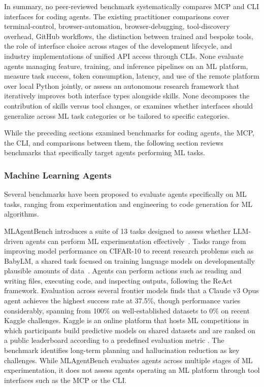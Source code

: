 \documentclass[
english,                 %
bibtex,                  %
includeExtraAbstracts, %
]{kththesis}
\numberwithin{listing}{chapter}
\begin{document}
In summary, no peer-reviewed benchmark systematically compares \gls{MCP} and \gls{CLI} interfaces for coding agents. The existing practitioner comparisons cover terminal-control, browser-automation, browser-debugging, tool-discovery overhead, GitHub workflows, the distinction between trained and bespoke tools, the role of interface choice across stages of the development lifecycle, and industry implementations of unified \gls{API} access through \glspl{CLI}. None evaluate agents managing feature, training, and inference pipelines on an \gls{ML} platform, measure task success, token consumption, latency, and use of the remote platform over local Python jointly, or assess an autonomous research framework that iteratively improves both interface types alongside skills. None decomposes the contribution of skills versus tool changes, or examines whether interfaces should generalize across \gls{ML} task categories or be tailored to specific categories.

While the preceding sections examined benchmarks for coding agents, the \gls{MCP}, the \gls{CLI}, and comparisons between them, the following section reviews benchmarks that specifically target agents performing \gls{ML} tasks.

\subsubsection{Machine Learning Agents}

Several benchmarks have been proposed to evaluate agents specifically on \gls{ML} tasks, ranging from experimentation and engineering to code generation for \gls{ML} algorithms.

\gls{ML}AgentBench introduces a suite of 13 tasks designed to assess whether \gls{LLM}-driven agents can perform \gls{ML} experimentation effectively~\cite{huang_mlagentbench_2024}. Tasks range from improving model performance on \gls{CIFAR}-10 to recent research problems such as \gls{BabyLM}, a shared task focused on training language models on developmentally plausible amounts of data~\cite{edman_mask_2025}. Agents can perform actions such as reading and writing files, executing code, and inspecting outputs, following the ReAct framework. Evaluation across several frontier models finds that a Claude v3 Opus agent achieves the highest success rate at 37.5\%, though performance varies considerably, spanning from 100\% on well-established datasets to 0\% on recent Kaggle challenges. Kaggle is an online platform that hosts \gls{ML} competitions in which participants build predictive models on shared datasets and are ranked on a public leaderboard according to a predefined evaluation metric \cite{kaggle_inc_kaggle_2026}. The benchmark identifies long-term planning and hallucination reduction as key challenges. While \gls{ML}AgentBench evaluates agents across multiple stages of \gls{ML} experimentation, it does not assess agents operating an \gls{ML} platform through tool interfaces such as the \gls{MCP} or the \gls{CLI}.
\end{document}
